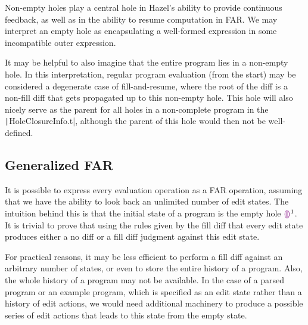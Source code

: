 Non-empty holes play a central hole in Hazel's ability to provide continuous feedback, as well as in the ability to resume computation in FAR. We may interpret an empty hole as encapsulating a well-formed expression in some incompatible outer expression.

It may be helpful to also imagine that the entire program lies in a non-empty hole. In this interpretation, regular program evaluation (from the start) may be considered a degenerate case of fill-and-resume, where the root of the diff is a non-fill diff that gets propagated up to this non-empty hole. This hole will also nicely serve as the parent for all holes in a non-complete program in the \texttt|HoleClosureInfo.t|, although the parent of this hole would then not be well-defined.

\subsection{Generalized FAR}
\label{sec:generalized-far}

It is possible to express every evaluation operation as a FAR operation, assuming that we have the ability to look back an unlimited number of edit states. The intuition behind this is that the initial state of a program is the empty hole $\textcolor{violet}{\llparenthesis}\textcolor{violet}{\rrparenthesis}^1$. It is trivial to prove that using the rules given by the fill diff that every edit state produces either a no diff or a fill diff judgment against this edit state.

For practical reasons, it may be less efficient to perform a fill diff against an arbitrary number of states, or even to store the entire history of a program. Also, the whole history of a program may not be available. In the case of a parsed program or an example program, which is specified as an edit state rather than a history of edit actions, we would need additional machinery to produce a possible series of edit actions that leads to this state from the empty state.

